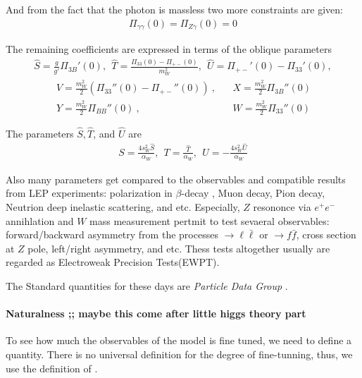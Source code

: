 And from the fact that the photon is massless two more constraints are given:
\begin{align}
 \Pi_{\gamma\gamma}(0) = \Pi_{Z\gamma}(0) = 0 \nonumber
\end{align}

The remaining coefficients are expressed in terms of the oblique parameters
\begin{align}
\hat{S}=\frac{g}{g'}\Pi_{3B}'(0), ~~ \hat{T}=\frac{\Pi_{33}(0)-\Pi_{+-}(0)}{m_W^2},~~ 
\hat{U}=\Pi_{+-}'(0)-\Pi_{33}'(0),
\end{align}
\begin{align}
&V= \frac{m_W^2}{2}( \Pi_{33}''(0)-\Pi_{+-}''(0) )~,~~~~&X= \frac{m_W^2}{2} \Pi_{3B}''(0)~~~\nonumber\\
&Y= \frac{m_W^2}{2} \Pi_{BB}''(0) ~,~~ ~&W= \frac{m_W^2}{2} \Pi_{33}''(0)~~~ 
\end{align}

The parameters $\hat{S}, \hat{T}$, and $\hat{U}$ are  
\begin{align}
 S=\frac{4 s_W^2 \hat{S}}{\alpha_W},~~ T=\frac{\hat{T}}{\alpha_W},~~U=-\frac{4 s_W^2 \hat{U}}{\alpha_W}
\end{align}


Also many parameters get compared to the observables and compatible results
from LEP experiments:
polarization in $\beta$-decay \cite{Koks:1976zec}, Muon decay\cite{Bardon:1965sd}, 
Pion decay, Neutrion deep inelastic scattering\cite{deGroot:1978feq}, and etc.
 Especially, $Z$ resononce via $e^+ e^-$ annihlation and $W$ mass measurement 
 pertmit to test sevaeral observables:
 forward/backward asymmetry from the processes $\to \ell\bar{\ell}$ or $\to f\bar{f}$,
 cross section at $Z$ pole, left/right asymmetry, and etc.
 Thess tests altogether usually are regarded as Electroweak Precision Tests(EWPT).

The Standard quantities for these days are \emph{Particle Data Group} . 


\paragraph{Naturalness ;; maybe this come after little higgs theory part}
To see how much the observables of the model is fine tuned, we need to define a quantity. 
There is no universal definition for the degree of fine-tunning, 
thus, we use the definition of . %

